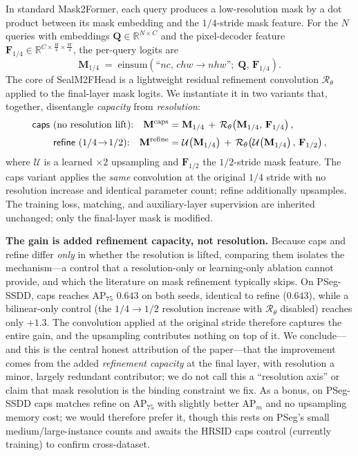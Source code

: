 \documentclass[journal]{IEEEtran}
\begin{document}
In standard Mask2Former, each query produces a low-resolution mask by a dot product between its mask embedding and the $1/4$-stride mask feature. For the $N$ queries with embeddings $\mathbf{Q}\in\mathbb{R}^{N\times C}$ and the pixel-decoder feature $\mathbf{F}_{1/4}\in\mathbb{R}^{C\times \frac{H}{4}\times \frac{W}{4}}$, the per-query logits are
\begin{equation}
\mathbf{M}_{1/4} \;=\; \mathrm{einsum}\!\left(\text{``}nc,\,chw \rightarrow nhw\text{''};\; \mathbf{Q},\, \mathbf{F}_{1/4}\right).
\label{eq:m2f-dot}
\end{equation}
The core of SealM2FHead is a lightweight residual refinement convolution $\mathcal{R}_{\theta}$ applied to the final-layer mask logits. We instantiate it in two variants that, together, disentangle \emph{capacity} from \emph{resolution}:
\begin{align}
\text{\textsf{caps} (no resolution lift):}\quad
\mathbf{M}^{\mathrm{caps}} &= \mathbf{M}_{1/4} \,+\, \mathcal{R}_{\theta}\!\left(\mathbf{M}_{1/4},\, \mathbf{F}_{1/4}\right),
\label{eq:caps}\\[2pt]
\text{\textsf{refine} ($1/4\!\rightarrow\!1/2$):}\quad
\mathbf{M}^{\mathrm{refine}} &= \mathcal{U}\!\left(\mathbf{M}_{1/4}\right) \,+\, \mathcal{R}_{\theta}\!\left(\mathcal{U}\!\left(\mathbf{M}_{1/4}\right),\, \mathbf{F}_{1/2}\right),
\label{eq:refine}
\end{align}
where $\mathcal{U}$ is a learned $\times2$ upsampling and $\mathbf{F}_{1/2}$ the $1/2$-stride mask feature. The \textsf{caps} variant applies the \emph{same} convolution at the original $1/4$ stride with no resolution increase and identical parameter count; \textsf{refine} additionally upsamples. The training loss, matching, and auxiliary-layer supervision are inherited unchanged; only the final-layer mask is modified.

\textbf{The gain is added refinement capacity, not resolution.} Because \textsf{caps} and \textsf{refine} differ \emph{only} in whether the resolution is lifted, comparing them isolates the mechanism---a control that a resolution-only or learning-only ablation cannot provide, and which the literature on mask refinement typically skips. On PSeg-SSDD, \textsf{caps} reaches AP$_{75}$ $0.643$ on both seeds, identical to \textsf{refine} ($0.643$), while a bilinear-only control (the $1/4\!\rightarrow\!1/2$ resolution increase with $\mathcal{R}_{\theta}$ disabled) reaches only $+1.3$. The convolution applied at the original stride therefore captures the entire gain, and the upsampling contributes nothing on top of it. We conclude---and this is the central honest attribution of the paper---that the improvement comes from the added \emph{refinement capacity} at the final layer, with resolution a minor, largely redundant contributor; we do not call this a ``resolution axis'' or claim that mask resolution is the binding constraint we fix. As a bonus, on PSeg-SSDD \textsf{caps} matches \textsf{refine} on AP$_{75}$ with slightly better AP$_m$ and no upsampling memory cost; we would therefore prefer it, though this rests on PSeg's small medium/large-instance counts and awaits the HRSID \textsf{caps} control (currently training) to confirm cross-dataset.
\end{document}
